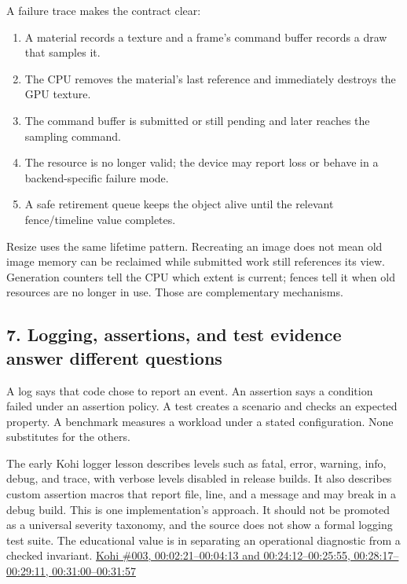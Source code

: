 A failure trace makes the contract clear:

\begin{enumerate}
\def\labelenumi{\arabic{enumi}.}
\tightlist
\item
  A material records a texture and a frame's command buffer records a draw that samples it.
\item
  The CPU removes the material's last reference and immediately destroys the GPU texture.
\item
  The command buffer is submitted or still pending and later reaches the sampling command.
\item
  The resource is no longer valid; the device may report loss or behave in a backend-specific failure mode.
\item
  A safe retirement queue keeps the object alive until the relevant fence/timeline value completes.
\end{enumerate}

Resize uses the same lifetime pattern. Recreating an image does not mean old image memory can be reclaimed while submitted work still references its view. Generation counters tell the CPU which extent is current; fences tell it when old resources are no longer in use. Those are complementary mechanisms.

\subsection{7. Logging, assertions, and test evidence answer different questions}\label{06-engine-ii-ch041-logging-assertions-and-test-evidence-answer-different-questions}

\hypertarget{06-engine-ii-ch041-logging-assertions-and-test-evidence-answer-different-questions}{}

A log says that code chose to report an event. An assertion says a condition failed under an assertion policy. A test creates a scenario and checks an expected property. A benchmark measures a workload under a stated configuration. None substitutes for the others.

The early Kohi logger lesson describes levels such as fatal, error, warning, info, debug, and trace, with verbose levels disabled in release builds. It also describes custom assertion macros that report file, line, and a message and may break in a debug build. This is one implementation's approach. It should not be promoted as a universal severity taxonomy, and the source does not show a formal logging test suite. The educational value is in separating an operational diagnostic from a checked invariant. \href{https://www.youtube.com/watch?v=l9e8PJskYnI&t=2m21s}{Kohi \#003, 00:02:21--00:04:13 and 00:24:12--00:25:55, 00:28:17--00:29:11, 00:31:00--00:31:57}

